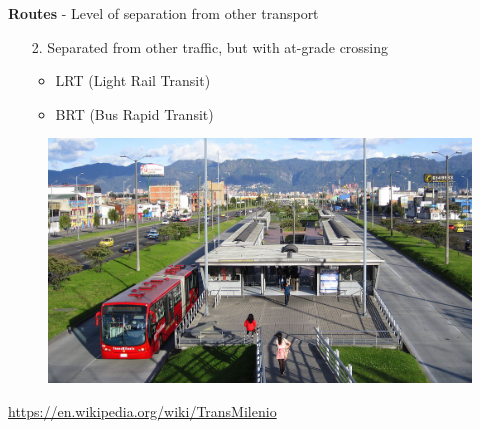 \documentclass[aspectratio=169]{beamer}
\begin{document}
\begin{frame}
	
	\textbf{Routes} - Level of separation from other transport
	
	
	\begin{itemize}
		
		\item[2.] Separated from other traffic, but with at-grade crossing
		
		\begin{itemize}
			\item LRT (Light Rail Transit)
			\item BRT (Bus Rapid Transit)
		\end{itemize}
		
	\end{itemize}
	
	\begin{figure}
		\centering
		\includegraphics[width=0.7\linewidth]{images/transmilenio.png}
	\end{figure}
	
	\tiny\url{https://en.wikipedia.org/wiki/TransMilenio}
	
	
\end{frame}
\end{document}

